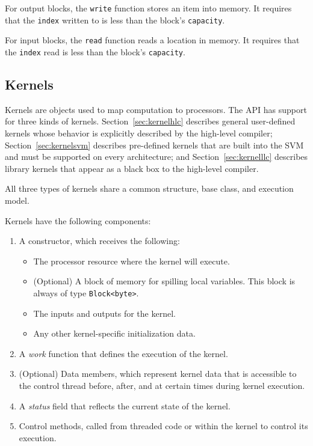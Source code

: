  For output blocks, the {\tt write} function stores an
item into memory.  It requires that the {\tt index} written to is less
than the block's {\tt capacity}.  

 For input blocks, the {\tt read} function reads a location
in memory.  It requires that the {\tt index} read is less than the
block's {\tt capacity}.

\subsection{Kernels}
\label{sec:kernel}

Kernels are objects used to map computation to processors. 
The API has support for three kinds of kernels.
Section~\ref{sec:kernelhlc} describes general user-defined kernels
whose behavior is explicitly described by the high-level compiler;
Section~\ref{sec:kernelsvm} describes pre-defined kernels that are
built into the SVM and must be supported on every architecture; and
Section~\ref{sec:kernelllc} describes library kernels that appear as a
black box to the high-level compiler. 

All three types of kernels share a common structure, base class, and execution model.


Kernels have the following components:

\begin{enumerate}

\item A constructor, which receives the following:

\begin{itemize}
\item The processor resource where the kernel will execute.
\item (Optional) A block of memory for spilling local variables. This
block is always of type {\tt Block<byte>}. 
\item The inputs and outputs for the kernel.
\item Any other kernel-specific initialization data.
\end{itemize}

\item A {\it work} function that defines the execution of the kernel.

\item (Optional) Data members, which represent kernel data that is
accessible to the control thread before, after, and at certain times
during kernel execution.

\item A {\it status} field that reflects the current state of the kernel.

\item Control methods, called from threaded code or within the kernel
to control its execution.

\end{enumerate}

